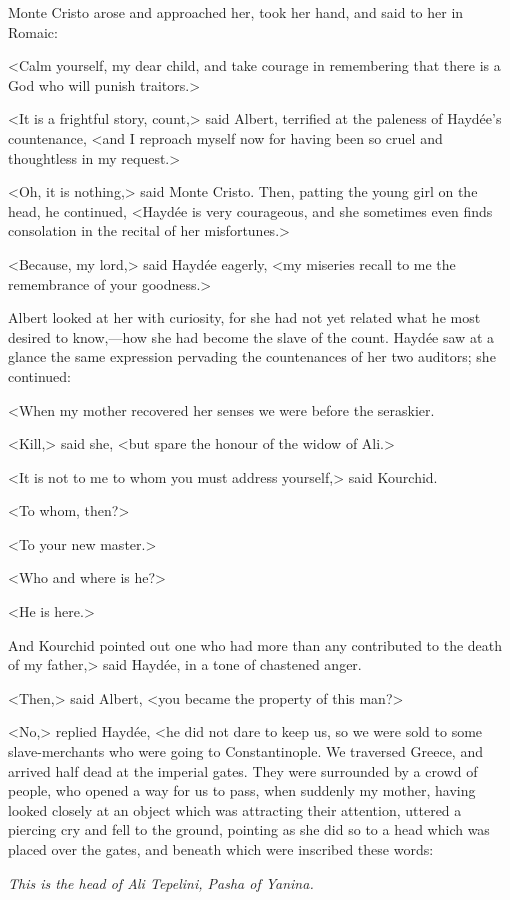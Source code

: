  Monte Cristo arose and approached her, took her hand, and said to her in Romaic: 

 <Calm yourself, my dear child, and take courage in remembering that there is a God who will punish traitors.> 

 <It is a frightful story, count,> said Albert, terrified at the paleness of Haydée's countenance, <and I reproach myself now for having been so cruel and thoughtless in my request.> 

 <Oh, it is nothing,> said Monte Cristo. Then, patting the young girl on the head, he continued, <Haydée is very courageous, and she sometimes even finds consolation in the recital of her misfortunes.> 

 <Because, my lord,> said Haydée eagerly, <my miseries recall to me the remembrance of your goodness.> 

 Albert looked at her with curiosity, for she had not yet related what he most desired to know,—how she had become the slave of the count. Haydée saw at a glance the same expression pervading the countenances of her two auditors; she continued: 

<When my mother recovered her senses we were before the seraskier. 

<Kill,> said she, <but spare the honour of the widow of Ali.>

<It is not to me to whom you must address yourself,> said Kourchid. 

 <To whom, then?>
 
 <To your new master.> 

 <Who and where is he?>
 
 <He is here.> 

And Kourchid pointed out one who had more than any contributed to the death of my father,> said Haydée, in a tone of chastened anger. 

 <Then,> said Albert, <you became the property of this man?>  
 
 <No,> replied Haydée, <he did not dare to keep us, so we were sold to some slave-merchants who were going to Constantinople. We traversed Greece, and arrived half dead at the imperial gates. They were surrounded by a crowd of people, who opened a way for us to pass, when suddenly my mother, having looked closely at an object which was attracting their attention, uttered a piercing cry and fell to the ground, pointing as she did so to a head which was placed over the gates, and beneath which were inscribed these words: 

\begin{center}
	\textit{This is the head of Ali Tepelini, Pasha of Yanina.}
	\end{center}

